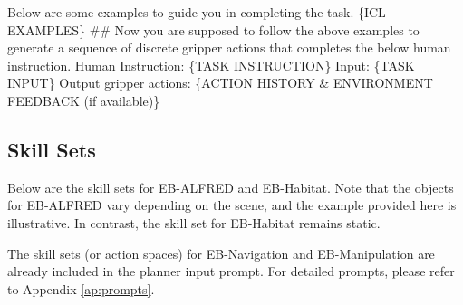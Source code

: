 \begin{tcolorbox}[colback=gray!5!white, colframe=gray!75!black, 
title=Prompt for EB-Manipulation, boxrule=0.5mm, width=\textwidth, arc=3mm, auto outer arc=true]
\newline
Below are some examples to guide you in completing the task. \newline
\newline
\{ICL EXAMPLES\}
\newline
\newline
\#\# Now you are supposed to follow the above examples to generate a sequence of discrete gripper actions that completes the below human instruction. \newline
Human Instruction: \{TASK INSTRUCTION\} \newline
Input: \{TASK INPUT\} \newline
Output gripper actions: \{ACTION HISTORY \& ENVIRONMENT FEEDBACK (if available)\}
\end{tcolorbox}

\clearpage
\subsection{Skill Sets}
Below are the skill sets for EB-ALFRED and EB-Habitat. Note that the objects for EB-ALFRED vary depending on the scene, and the example provided here is illustrative. In contrast, the skill set for EB-Habitat remains static.  

The skill sets (or action spaces) for EB-Navigation and EB-Manipulation are already included in the planner input prompt. For detailed prompts, please refer to Appendix \ref{ap:prompts}.

